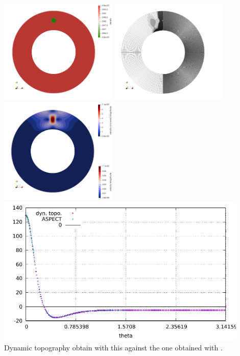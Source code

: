 \begin{center}
\includegraphics[width=5.6cm]{python_codes/fieldstone_152/RESULTS/exp2_2D/rho}
\includegraphics[width=5.6cm]{python_codes/fieldstone_152/RESULTS/exp2_2D/mesh}
\includegraphics[width=5.6cm]{python_codes/fieldstone_152/RESULTS/exp2_2D/vel}\\
\includegraphics[width=12cm]{python_codes/fieldstone_152/RESULTS/exp2_2D/aspect/dynamic_topography.pdf}\\
{\captionfont Dynamic topography obtain with this \stone against the one obtained with \aspect.}
\end{center}



